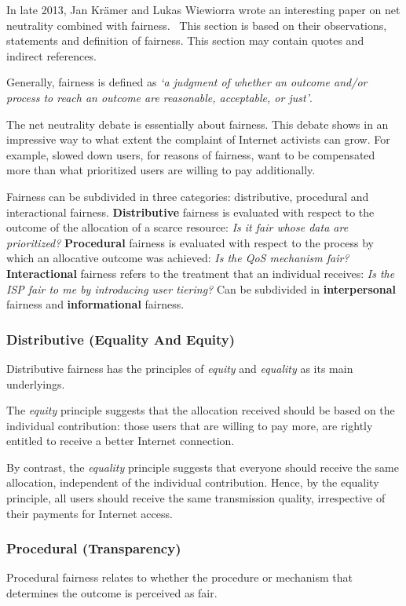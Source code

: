 
In late 2013, Jan Kr\"{a}mer and Lukas Wiewiorra wrote an interesting paper on net neutrality combined with fairness.~\cite{kramer2013fair} This section is based on their observations, statements and definition of fairness. This section may contain quotes and indirect references.

Generally, fairness is defined as \emph{`a judgment of whether an outcome and/or process to reach an outcome are reasonable, acceptable, or just'}.

The net neutrality debate is essentially about fairness. This debate shows in an impressive way to what extent the complaint of Internet activists can grow. For example, slowed down users, for reasons of fairness, want to be compensated more than what prioritized users are willing to pay additionally.

Fairness can be subdivided in three categories: distributive, procedural and interactional fairness. \textbf{Distributive} fairness is evaluated with respect to the outcome of the allocation of a scarce resource: \emph{Is it fair whose data are prioritized?} \textbf{Procedural} fairness is evaluated with respect to the process by which an allocative outcome was achieved: \emph{Is the QoS mechanism fair?} \textbf{Interactional} fairness refers to the treatment that an individual receives: \emph{Is the ISP fair to me by introducing user tiering?} Can be subdivided in \textbf{interpersonal} fairness and \textbf{informational} fairness.

\subsubsection{Distributive (Equality And Equity)}
Distributive fairness has the principles of \emph{equity} and \emph{equality} as its main underlyings.

The \emph{equity} principle suggests that the allocation received should be based on the individual contribution: those users that are willing to pay more, are rightly entitled to receive a better Internet connection.

By contrast, the \emph{equality} principle suggests that everyone should receive the same allocation, independent of the individual contribution. Hence, by the equality principle, all users should receive the same transmission quality, irrespective of their payments for Internet access.

\subsubsection{Procedural (Transparency)}
Procedural fairness relates to whether the procedure or mechanism that determines the outcome is perceived as fair.

